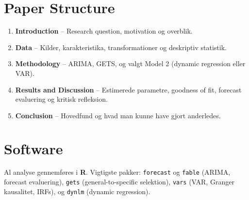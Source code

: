 \section{Paper Structure}

\begin{enumerate}[nosep]
    \item \textbf{Introduction} -- Research question, motivation og overblik.
    \item \textbf{Data} -- Kilder, karakteristika, transformationer og
          deskriptiv statistik.
    \item \textbf{Methodology} -- ARIMA, GETS, og valgt Model 2
          (dynamic regression eller VAR).
    \item \textbf{Results and Discussion} -- Estimerede parametre,
          goodness of fit, forecast evaluering og kritisk refleksion.
    \item \textbf{Conclusion} -- Hovedfund og hvad man kunne have gjort
          anderledes.
\end{enumerate}

\section{Software}

Al analyse gennemføres i \textbf{R}. Vigtigste pakker:
\texttt{forecast} og \texttt{fable} (ARIMA, forecast evaluering),
\texttt{gets} (general-to-specific selektion),
\texttt{vars} (VAR, Granger kausalitet, IRFs), og
\texttt{dynlm} (dynamic regression).

